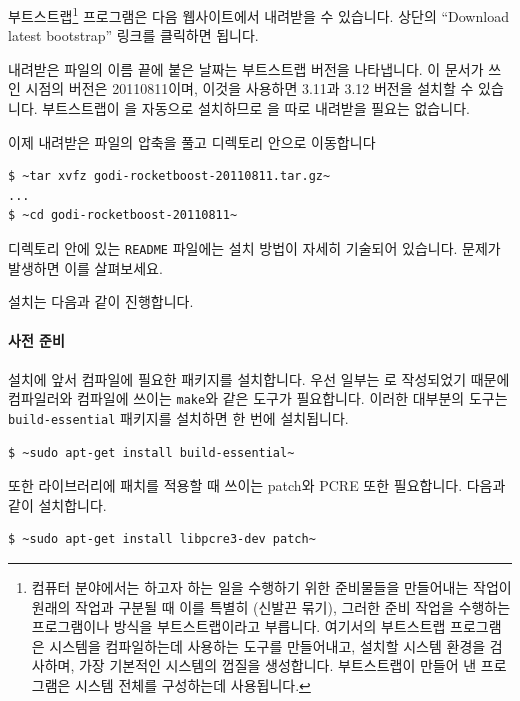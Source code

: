 \GODI{} 부트스트랩\footnote{컴퓨터 분야에서는 하고자 하는 일을 수행하기 위한
  준비물들을 만들어내는 작업이 원래의 작업과 구분될 때 이를 특별히
  (신발끈 묶기), 그러한 준비 작업을 수행하는
  프로그램이나 방식을 부트스트랩이라고 부릅니다. 여기서의 \GODI{} 부트스트랩
  프로그램은 시스템을 컴파일하는데 사용하는 도구를 만들어내고, 설치할
  시스템 환경을 검사하며, 가장 기본적인 \GODI{} 시스템의 껍질을 생성합니다.
  부트스트랩이 만들어 낸 프로그램은 \GODI{} 시스템 전체를 구성하는데
  사용됩니다.} 프로그램은 다음 웹사이트에서 내려받을 수
있습니다. 상단의 ``Download latest bootstrap'' 링크를 클릭하면 됩니다.

\begin{center}
\end{center}

내려받은 파일의 이름 끝에 붙은 날짜는 부트스트랩 버전을 나타냅니다. 이 문서가
쓰인 시점의 버전은 20110811이며, 이것을 사용하면 \OCAML{} 3.11과 3.12 버전을
설치할 수 있습니다. 부트스트랩이 \OCAML{}을 자동으로 설치하므로 \OCAML{}을
따로 내려받을 필요는 없습니다.

이제 내려받은 파일의 압축을 풀고 디렉토리 안으로 이동합니다

\begin{lstlisting}
$ ~tar xvfz godi-rocketboost-20110811.tar.gz~
...
$ ~cd godi-rocketboost-20110811~
\end{lstlisting}

디렉토리 안에 있는 \texttt{README} 파일에는 설치 방법이 자세히 기술되어
있습니다. 문제가 발생하면 이를 살펴보세요.

설치는 다음과 같이 진행합니다.

\paragraph{사전 준비} 설치에 앞서 컴파일에 필요한 패키지를
설치합니다. 우선 \OCAML{} 일부는 \CC{}로 작성되었기 때문에 \CC{} 컴파일러와
컴파일에 쓰이는 \texttt{make}와 같은 도구가 필요합니다. 이러한 대부분의 도구는
\texttt{build-essential} 패키지를 설치하면 한 번에 설치됩니다.

\begin{lstlisting}
$ ~sudo apt-get install build-essential~
\end{lstlisting}

또한 라이브러리에 패치를 적용할 때 쓰이는 \textsf{patch}와 \textsf{PCRE} 또한
필요합니다. 다음과 같이 설치합니다.

\begin{lstlisting}
$ ~sudo apt-get install libpcre3-dev patch~
\end{lstlisting}

